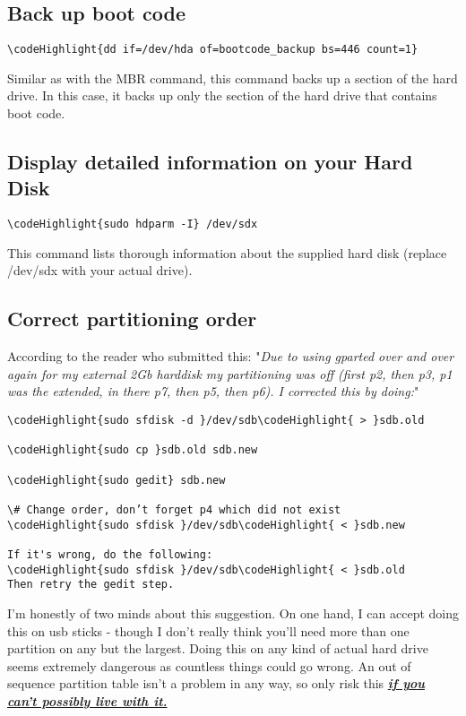 \documentclass[12pt,a4paper]{article}
\begin{document}
\subsection{Back up boot code}
\begin{Verbatim}[commandchars=\\\{\}]
\codeHighlight{dd if=/dev/hda of=bootcode_backup bs=446 count=1}
\end{Verbatim}
Similar as with the MBR command, this command backs up a section of the hard drive. In this case, it backs up only the section of the hard drive that contains boot code.

\subsection{Display detailed information on your Hard Disk}
\begin{Verbatim}[commandchars=\\\{\}]
\codeHighlight{sudo hdparm -I} /dev/sdx
\end{Verbatim}
This command lists thorough information about the supplied hard disk (replace /dev/sdx with your actual drive).

\subsection{Correct partitioning order}
According to the reader who submitted this:
"\textit{Due to using gparted over and over again for my external 2Gb harddisk my partitioning was off (first p2, then p3, p1 was the extended, in there p7, then p5, then p6).
I corrected this by doing:}"
\begin{Verbatim}[commandchars=\\\{\}]
\codeHighlight{sudo sfdisk -d }/dev/sdb\codeHighlight{ > }sdb.old

\codeHighlight{sudo cp }sdb.old sdb.new

\codeHighlight{sudo gedit} sdb.new 

\# Change order, don’t forget p4 which did not exist
\codeHighlight{sudo sfdisk }/dev/sdb\codeHighlight{ < }sdb.new

If it's wrong, do the following:
\codeHighlight{sudo sfdisk }/dev/sdb\codeHighlight{ < }sdb.old
Then retry the gedit step.
\end{Verbatim}
I'm honestly of two minds about this suggestion.  On one hand, I can accept doing this on usb sticks - though I don't really think you'll need more than one partition on any but the largest.  Doing this on any kind of actual hard drive seems extremely dangerous as countless things could go wrong. An out of sequence partition table isn't a problem in any way, so only risk this \underline{\textbf{\textit{if you can't possibly live with it.}}}
\end{document}
